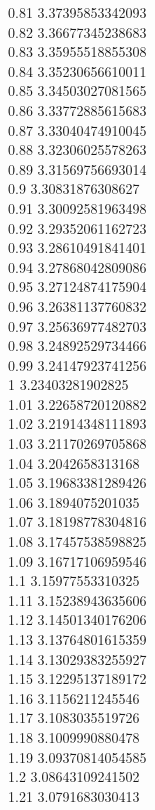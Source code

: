 {0.81	3.37395853342093\\
0.82	3.36677345238683\\
0.83	3.35955518855308\\
0.84	3.35230656610011\\
0.85	3.34503027081565\\
0.86	3.33772885615683\\
0.87	3.33040474910045\\
0.88	3.32306025578263\\
0.89	3.31569756693014\\
0.9	3.30831876308627\\
0.91	3.30092581963498\\
0.92	3.29352061162723\\
0.93	3.28610491841401\\
0.94	3.27868042809086\\
0.95	3.27124874175904\\
0.96	3.26381137760832\\
0.97	3.25636977482703\\
0.98	3.24892529734466\\
0.99	3.24147923741256\\
1	3.23403281902825\\
1.01	3.22658720120882\\
1.02	3.21914348111893\\
1.03	3.21170269705868\\
1.04	3.2042658313168\\
1.05	3.19683381289426\\
1.06	3.1894075201035\\
1.07	3.18198778304816\\
1.08	3.17457538598825\\
1.09	3.16717106959546\\
1.1	3.15977553310325\\
1.11	3.15238943635606\\
1.12	3.14501340176206\\
1.13	3.13764801615359\\
1.14	3.13029383255927\\
1.15	3.12295137189172\\
1.16	3.1156211245546\\
1.17	3.1083035519726\\
1.18	3.1009990880478\\
1.19	3.09370814054585\\
1.2	3.08643109241502\\
1.21	3.0791683030413\\
}
